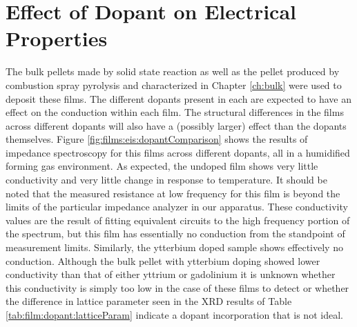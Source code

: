 \section{Effect of Dopant on Electrical Properties}
The bulk pellets made by solid state reaction as well as the pellet produced by combustion spray pyrolysis and characterized in Chapter \ref{ch:bulk} were used to deposit these films. The different dopants present in each are expected to have an effect on the conduction within each film. The structural differences in the films across different dopants will also have a (possibly larger) effect than the dopants themselves. Figure \ref{fig:films:eis:dopantComparison} shows the results of impedance spectroscopy for this films across different dopants, all in a humidified forming gas environment. As expected, the undoped film shows very little conductivity and very little change in response to temperature. It should be noted that the measured resistance at low frequency for this film is beyond the limits of the particular impedance analyzer in our apparatus. These conductivity values are the result of fitting equivalent circuits to the high frequency portion of the spectrum, but this film has essentially no conduction from the standpoint of measurement limits. Similarly, the ytterbium doped sample shows effectively no conduction. Although the bulk pellet with ytterbium doping showed lower conductivity than that of either yttrium or gadolinium it is unknown whether this conductivity is simply too low in the case of these films to detect or whether the difference in lattice parameter seen in the XRD results of Table \ref{tab:film:dopant:latticeParam} indicate a dopant incorporation that is not ideal. 
